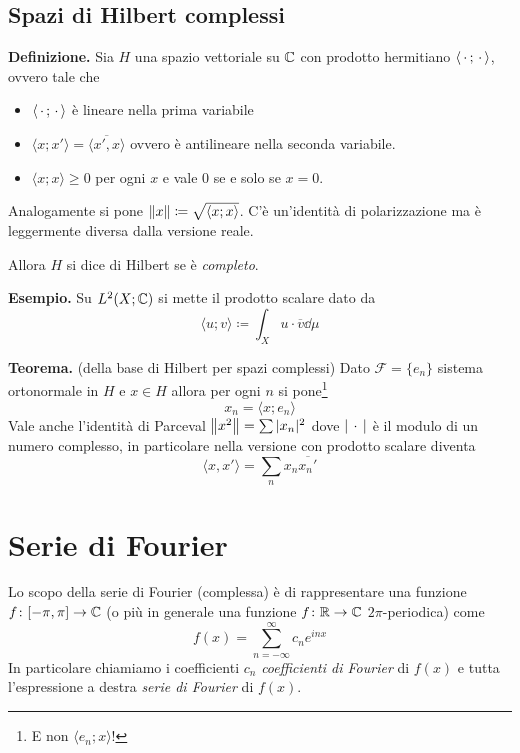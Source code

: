 %
%

\section{Spazi di Hilbert complessi}

\textbf{Definizione.}
Sia $H$ una spazio vettoriale su $\mathbb C$ con prodotto hermitiano $\langle\,\cdot\,; \,\cdot\,\rangle$, ovvero tale che
\begin{itemize}
	\item $\langle \,\cdot\,; \,\cdot\, \rangle$ è lineare nella prima variabile
	\item $\langle x; x' \rangle = \overline{\langle x', x \rangle}$ ovvero è antilineare nella seconda variabile.
	\item $\langle x; x \rangle \geq 0$ per ogni $x$ e vale $0$ se e solo se $x = 0$.
\end{itemize}

Analogamente si pone $\left\lVert x \right\rVert \coloneqq \sqrt{\langle x; x \rangle}$. C'è un'identità di polarizzazione ma è leggermente diversa dalla versione reale.

Allora $H$ si dice di Hilbert se è \textit{completo}.

\textbf{Esempio.}
Su $L^2(X; \mathbb C)$ si mette il prodotto scalare dato da
$$
\langle u; v \rangle \coloneqq \int_X u \cdot \overline v \dd \mu
$$

\textbf{Teorema.} (della base di Hilbert per spazi complessi)
Dato $\mathcal F = \{ e_n \}$ sistema ortonormale in $H$ e $x \in H$ allora per ogni $n$ si pone\footnote{E non $\langle e_n; x \rangle$!}
$$
x_n = \langle x; e_n \rangle
$$
Vale anche l'identità di Parceval $\left\lVert x^2 \right\rVert = \sum |x_n|^2$ dove $|\,\cdot\,|$ è il modulo di un numero complesso, in particolare nella versione con prodotto scalare diventa
$$
\langle x, x' \rangle = \sum_n x_n \overline{x_n'}
$$

\chapter{Serie di Fourier}

Lo scopo della serie di Fourier (complessa) è di rappresentare una funzione $f \colon [-\pi, \pi] \to \mathbb C$ (o più in generale una funzione $f \colon \mathbb R \to \mathbb C$ $2\pi$-periodica) come
$$
f(x) = \sum_{n=-\infty}^\infty c_n e^{i n x}
$$
In particolare chiamiamo i coefficienti $c_n$ \textit{coefficienti di Fourier} di $f(x)$ e tutta l'espressione a destra \textit{serie di Fourier} di $f(x)$.


